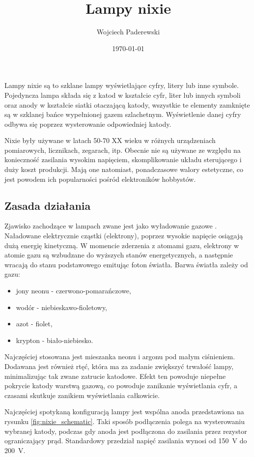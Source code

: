 \documentclass[../main.tex]{subfiles}
\author{Wojciech Paderewski}
\date{\today}
\title{Lampy nixie}
\begin{document}
Lampy nixie są to szklane lampy wyświetlające cyfry, litery lub inne symbole.
Pojedyncza lampa składa się z katod w kształcie cyfr, liter lub innych symboli oraz anody w kształcie siatki otaczającą katody, wszystkie
te elementy zamknięte są w szklanej bańce wypełnionej gazem szlachetnym.
Wyświetlenie danej cyfry odbywa się poprzez wysterowanie odpowiedniej katody.

Nixie były używane w latach 50-70 XX wieku w różnych urządzeniach pomiarowych, licznikach, zegarach, itp. 
Obecnie nie są używane ze względu na konieczność zasilania wysokim napięciem, skomplikowanie układu sterującego i duży koszt produkcji.
Mają one natomiast, ponadczasowe walory estetyczne, co jest powodem ich popularności pośród elektroników hobbystów.

\subsection{Zasada działania}
Zjawisko zachodzące w lampach zwane jest jako wyładowanie gazowe \cite{st:nixie}.
Naładowane elektrycznie cząstki (elektrony), poprzez wysokie napięcie osiągają dużą energię kinetyczną.
W momencie zderzenia z atomami gazu, elektrony w atomie gazu są wzbudzane do wyższych stanów energetycznych, a następnie wracają do stanu podstawowego emitując foton światła.
Barwa światła zależy od gazu:
\begin{itemize}
  \item jony neonu - czerwono-pomarańczowe,
  \item wodór - niebieskawo-fioletowy,
  \item azot - fiolet,
  \item krypton - biało-niebiesko.
\end{itemize}

Najczęściej stosowana jest mieszanka neonu i argonu pod małym ciśnieniem. Dodawana jest również rtęć, 
która ma za zadanie zwiększyć trwałość lampy, 
minimalizując tak zwane zatrucie katodowe. Efekt ten powoduje niepełne pokrycie katody warstwą gazową, co powoduje zanikanie wyświetlania cyfr,
a czasami skutkuje zanikiem wyświetlania całkowicie.

Najczęściej spotykaną konfiguracją lampy jest wspólna anoda przedstawiona na rysunku \ref{fig:nixie_schematic}.
Taki sposób podłączenia polega na wysterowaniu wybranej katody, podczas gdy anoda jest podłączona
do zasilania przez rezystor ograniczający prąd. 
Standardowy przedział napięć zasilania wynosi od \SI{150}{\volt} do \SI{200}{\volt}.
\end{document}
